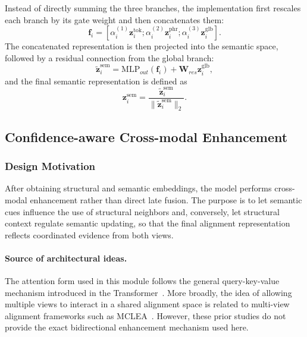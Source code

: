 Instead of directly summing the three branches, the implementation first rescales each branch by its gate weight and then concatenates them:
\begin{equation}
\mathbf{f}_i
=
[
\alpha_i^{(1)}\mathbf{z}_i^{\mathrm{tok}};
\alpha_i^{(2)}\mathbf{z}_i^{\mathrm{phr}};
\alpha_i^{(3)}\mathbf{z}_i^{\mathrm{glb}}
].
\end{equation}
The concatenated representation is then projected into the semantic space, followed by a residual connection from the global branch:
\begin{equation}
\tilde{\mathbf{z}}_i^{\mathrm{sem}}
=
\mathrm{MLP}_{out}(\mathbf{f}_i)
+
\mathbf{W}_{res}\mathbf{z}_i^{\mathrm{glb}},
\end{equation}
and the final semantic representation is defined as
\begin{equation}
\mathbf{z}_i^{\mathrm{sem}}
=
\frac{\tilde{\mathbf{z}}_i^{\mathrm{sem}}}{\|\tilde{\mathbf{z}}_i^{\mathrm{sem}}\|_2}.
\end{equation}

\subsection{Confidence-aware Cross-modal Enhancement}

\subsubsection{Design Motivation}

After obtaining structural and semantic embeddings, the model performs cross-modal enhancement rather than direct late fusion. The purpose is to let semantic cues influence the use of structural neighbors and, conversely, let structural context regulate semantic updating, so that the final alignment representation reflects coordinated evidence from both views.

\paragraph{Source of architectural ideas.}
The attention form used in this module follows the general query-key-value mechanism introduced in the Transformer~\cite{vaswani2017attention}. More broadly, the idea of allowing multiple views to interact in a shared alignment space is related to multi-view alignment frameworks such as MCLEA~\cite{lin2022mclea}. However, these prior studies do not provide the exact bidirectional enhancement mechanism used here.

